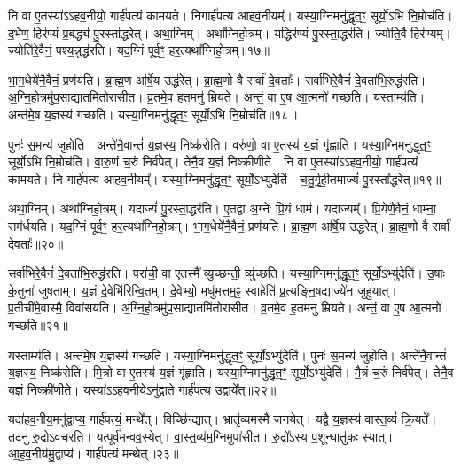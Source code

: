 नि वा ए॒तस्या॑\-ऽऽहव॒नीयो॒ गार्\mbox{}ह॑पत्यं कामयते।
निगार्\mbox{}ह॑पत्य आहव॒नीयम्᳚।
यस्या॒ग्निमनु॑द्धृत॒ꣳ॒ सूर्यो॒ऽभि नि॒म्रोच॑ति।
द॒र्भेण॒ हिर॑ण्यं प्र॒बद्ध्य॑ पु॒रस्ता᳚द्धरेत्।
अथा॒ग्निम्।
अथा᳚ग्निहो॒त्रम्।
यद्धिर॑ण्यं पु॒रस्ता॒द्धर॑ति।
ज्योति॒र्वै हिर॑ण्यम्।
ज्योति॑रे॒वैनं॒ पश्य॒न्नुद्ध॑रति।
यद॒ग्निं पूर्व॒ꣳ॒ हर॒त्यथा᳚ग्निहो॒त्रम्॥१७॥\ip

भा॒ग॒धेये॑नै॒वैनं॒ प्रण॑यति।
ब्रा॒ह्म॒ण आ॑र्\mbox{}षे॒य उद्ध॑रेत्।
ब्रा॒ह्म॒णो वै सर्वा॑ दे॒वताः᳚।
सर्वा॑भिरे॒वैनं॑ दे॒वता॑भि॒रुद्ध॑रति।
अ॒ग्नि॒हो॒त्रमु॑प॒साद्यातमि॑तोरासीत।
व्र॒तमे॒व ह॒तमनु॑ म्रियते।
अन्तं॒ वा ए॒ष आ॒त्मनो॑ गच्छति।
यस्ताम्य॑ति।
अन्त॑मे॒ष य॒ज्ञस्य॑ गच्छति।
यस्या॒ग्निमनु॑द्धृत॒ꣳ॒ सूर्यो॒ऽभि नि॒म्रोच॑ति॥१८॥\ip

पुनः॑ स॒मन्य॑ जुहोति।
अन्ते॑नै॒वान्तं॑ य॒ज्ञस्य॒ निष्क॑रोति।
वरु॑णो॒ वा ए॒तस्य॑ य॒ज्ञं गृ॑ह्णाति।
यस्या॒ग्निमनु॑द्धृत॒ꣳ॒ सूर्यो॒ऽभि नि॒म्रोच॑ति।
वा॒रु॒णं च॒रुं निर्व॑पेत्।
तेनै॒व य॒ज्ञं निष्क्री॑णीते।
नि वा ए॒तस्या॑\-ऽऽहव॒नीयो॒ गार्\mbox{}ह॑पत्यं कामयते।
नि गार्\mbox{}ह॑पत्य आहव॒नीयम्᳚।
यस्या॒ग्निमनु॑द्धृत॒ꣳ॒ सूर्यो॒\-ऽभ्यु॑देति॑।
च॒तु॒र्गृ॒ही॒तमाज्यं॑ पु॒रस्ता᳚द्धरेत्॥१९॥\ip

अथा॒ग्निम्।
अथा᳚ग्निहो॒त्रम्।
यदाज्यं॑ पु॒रस्ता॒द्धर॑ति।
ए॒तद्वा अ॒ग्नेः प्रि॒यं धाम॑।
यदाज्यम्᳚।
प्रि॒येणै॒वैनं॒ धाम्ना॒ सम॑र्धयति।
यद॒ग्निं पूर्व॒ꣳ॒ हर॒त्यथा᳚ग्निहो॒त्रम्।
भा॒ग॒धेये॑नै॒वैनं॒ प्रण॑यति।
ब्रा॒ह्म॒ण आ॑र्\mbox{}षे॒य उद्ध॑रेत्।
ब्रा॒ह्म॒णो वै सर्वा॑ दे॒वताः᳚॥२०॥\ip

सर्वा॑भिरे॒वैनं॑ दे॒वता॑भि॒रुद्ध॑रति।
परा॑ची॒ वा ए॒तस्मै᳚ व्यु॒च्छन्ती॒ व्यु॑च्छति।
यस्या॒ग्निमनु॑द्धृत॒ꣳ॒ सूर्यो॒\-ऽभ्यु॑देति॑।
उ॒षाः के॒तुना॑ जुषताम्।
य॒ज्ञं दे॒वेभि॑रिन्वि॒तम्।
दे॒वेभ्यो॒ मधु॑मत्तम॒ꣴ॒ स्वाहेति॑ प्र॒त्यङ्नि॒षद्याज्ये॑न जुहुयात्।
प्र॒तीची॑मे॒वास्मै॒ विवा॑सयति।
अ॒ग्नि॒हो॒त्रमु॑प॒साद्यातमि॑तोरासीत।
व्र॒तमे॒व ह॒तमनु॑ म्रियते।
अन्तं॒ वा ए॒ष आ॒त्मनो॑ गच्छति॥२१॥\ip

यस्ताम्य॑ति।
अन्त॑मे॒ष य॒ज्ञस्य॑ गच्छति।
यस्या॒ग्निमनु॑द्धृत॒ꣳ॒ सूर्यो॒\-ऽभ्यु॑देति॑।
पुनः॑ स॒मन्य॑ जुहोति।
अन्ते॑नै॒वान्तं॑ य॒ज्ञस्य॒ निष्क॑रोति।
मि॒त्रो वा ए॒तस्य॑ य॒ज्ञं गृ॑ह्णाति।
यस्या॒ग्निमनु॑द्धृत॒ꣳ॒ सूर्यो॒\-ऽभ्यु॑देति॑।
मै॒त्रं च॒रुं निर्व॑पेत्।
तेनै॒व य॒ज्ञं निष्क्री॑णीते।
यस्या॑\-ऽऽहव॒नीये\-ऽनु॑द्वाते॒ गार्\mbox{}ह॑पत्य उ॒द्वाये᳚त्॥२२॥\ip

यदा॑हव॒नीय॒मनु॑द्वाप्य॒ गार्\mbox{}ह॑पत्यं॒ मन्थे᳚त्।
वि\-च्छि॑न्द्यात्।
भ्रातृ॑व्यमस्मै जनयेत्।
यद्वै य॒ज्ञस्य॑ वास्त॒व्यं॑ क्रि॒यते᳚।
तदनु॑ रु॒द्रो\-ऽव॑चरति।
यत्पूर्व॑मन्वव॒स्येत्।
वा॒स्त॒व्य॑म॒ग्निमुपा॑सीत।
रु॒द्रो᳚ऽस्य प॒शून्घातु॑कः स्यात्।
आ॒ह॒व॒नीय॑मु॒द्वाप्य॑।
गार्\mbox{}ह॑पत्यं मन्थेत्॥२३॥\ip

